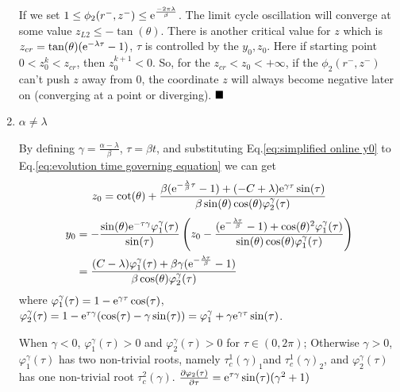 \documentclass[a4paper,10pt]{article}
\begin{document}
\begin{enumerate}
		 If we set $1\leq \phi_2(r^-,z^-) \leq {\rm e}^{\frac{- 2 \pi \lambda}{\beta}}$. The limit cycle oscillation will converge at some value $z_{L2} \leq -\tan(\theta)$. There is another critical value for $z$ which is $z_{cr}= \tan(\theta)( {\rm e}^{-\lambda \tau}-1)$, $\tau$ is controlled by the $y_0,z_0$. Here if starting point $0<z_0^k<z_{cr}$, then $z_0^{k+1}<0$. So, for the $ z_{cr}< z_0 < +\infty$, if the $\phi_2(r^-,z^-)$ can't push $z$ away from 0, the coordinate $z$ will always become negative later on (converging at a point or diverging). $\hfill\blacksquare$
		\item $\alpha \neq \lambda$
		
		By defining $\gamma = \frac{\alpha - \lambda}{\beta}$, $\tau = \beta t$, and substituting Eq.\ref{eq:simplified online y0} to Eq.\ref{eq:evolution time governing equation} we can get 
			\begin{align}
			{z_0} =\cot(\theta)+\frac{\beta ({\rm e}^{-\frac{\lambda}{\beta} \tau}-1)+(-C+\lambda) {\rm e}^{ \gamma\tau} \sin(\tau)}
			{\beta \sin(\theta) \cos(\theta) \varphi_2^{\gamma}(\tau) }
			\label{eq:simplified online z0 case 2}
			\end{align}
			\begin{align}
			\nonumber
			y_0 &=-\frac{\sin(\theta){\rm e}^{-\tau \gamma} \varphi_1^{\gamma}(\tau)}{\sin(\tau)}
			\left(
			{z_0}-\frac{
			 ({\rm e}^{-\frac{\lambda \tau}{\beta}}-1)+\cos(\theta)^{2}  \varphi_1^{\gamma}(\tau)
			}
			{
			\sin(\theta) \cos(\theta)  \varphi_1^{\gamma}(\tau)
			}
			\right)\\
			&=\frac{
				(C-\lambda) \varphi_1^{\gamma}(\tau)+\beta \gamma ({\rm e}^{- \frac{\lambda \tau}{\beta}}-1)
			}
			{\beta \cos(\theta) \varphi_2^{\gamma}(\tau)
				}
			\end{align}
			where $\varphi_1^{\gamma}(\tau)=1-{\rm e}^{ \gamma\tau}\cos(\tau)$, $\varphi_2^{\gamma}(\tau)=1-{\rm e}^{\tau \gamma}(\cos(\tau)-\gamma \sin(\tau)) = \varphi_1^{\gamma} + \gamma {\rm e}^{\gamma\tau }\sin(\tau)$.
			
			When $\gamma<0$, $\varphi_1^{\gamma}(\tau)>0$ and $\varphi_2^{\gamma}(\tau)>0$ for $\tau \in (0, 2 \pi)$;
			Otherwise $\gamma >0$, $\varphi_1^{\gamma}(\tau)$  has two non-trivial roots, namely $\tau_c^1(\gamma)_1$and  $\tau_c^1(\gamma)_2$, and $\varphi_2^{\gamma}(\tau)$ has one non-trivial root  $\tau_c^2(\gamma)$.
			$\frac{\partial \varphi_2(\tau)}{\partial \tau}={\rm e}^{\tau \gamma} \sin(\tau) (\gamma^{2}+1)$
			

\end{enumerate}
\end{document}
